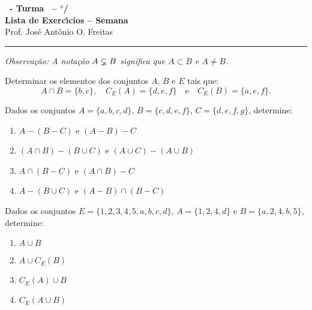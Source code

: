 \documentclass[12pt]{exam}
\begin{document}
    \begin{center}
    {\Large\bf \disciplina\ - Turma \turma\ -- \semestre$^{o}$/\ano} \\ \vspace{9pt} {\large\bf
        Lista de Exerc{\'\i}cios -- Semana \numerosemana}\\ \vspace{9pt} Prof. Jos{\'e} Ant{\^o}nio O. Freitas
    \end{center}
    \hrule

    \vspace{.6cm}

    \begin{center}
        \textit{Observa\c{c}\~ao: A nota\c{c}\~ao $A \varsubsetneq B$ significa que $A \subset B$ e $A \ne B$.}
    \end{center}

    \questao{} Determinar os elementos dos conjuntos $A$, $B$ e $E$ tais que:
\[
    A \cap B = \{b, c\}, \quad C_E(A) = \{d, e, f\} \quad \mbox{e}\quad C_E(B) = \{a, e, f\}.
\]

\vspace{.3cm}

\questao{} Dados os conjuntos $A = \{a, b, c, d\}$, $B = \{c, d, e, f\}$, $C = \{d, e, f, g\}$, determine:
\begin{enumerate}[label={\alph*})]
    \item $A - (B - C)$ e $(A - B) - C$

    \item $(A \cap B) - (B \cup C)$ e $(A \cup C) - (A \cup B)$

    \item $A \cap (B - C)$ e $(A \cap B) - C$

    \item $A - (B \cup C)$ e $(A - B) \cap (B - C)$
\end{enumerate}

\questao{} Dados os conjuntos $E = \{1,2,3,4,5,a,b,c,d\}$, $A = \{1,2,4,d\}$ e $B = \{a,2,4,b,5\}$, determine:
\begin{multicols}{2}
    \begin{enumerate}[label={\alph*})]
        \item $A \cup B$

        \item $A \cup C_E(B)$

        \item $C_E(A) \cup B$

        \item $C_E(A \cup B)$
    \end{enumerate}
\end{multicols}
\end{document}
